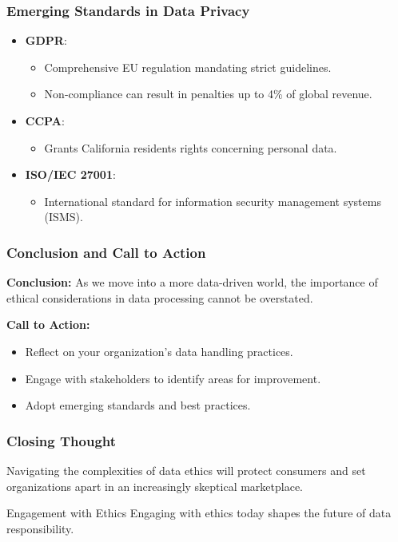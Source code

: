 \documentclass{beamer}
\begin{document}
\begin{frame}[fragile]
    \frametitle{Emerging Standards in Data Privacy}
    \begin{itemize}
        \item \textbf{GDPR}: 
            \begin{itemize}
                \item Comprehensive EU regulation mandating strict guidelines.
                \item Non-compliance can result in penalties up to 4\% of global revenue.
            \end{itemize}
        \item \textbf{CCPA}: 
            \begin{itemize}
                \item Grants California residents rights concerning personal data.
            \end{itemize}
        \item \textbf{ISO/IEC 27001}: 
            \begin{itemize}
                \item International standard for information security management systems (ISMS).
            \end{itemize}
    \end{itemize}
\end{frame}

\begin{frame}[fragile]
    \frametitle{Conclusion and Call to Action}
    \textbf{Conclusion:}
    As we move into a more data-driven world, the importance of ethical considerations in data processing cannot be overstated.
    
    \textbf{Call to Action:}
    \begin{itemize}
        \item Reflect on your organization’s data handling practices.
        \item Engage with stakeholders to identify areas for improvement.
        \item Adopt emerging standards and best practices.
    \end{itemize}
\end{frame}

\begin{frame}[fragile]
    \frametitle{Closing Thought}
    Navigating the complexities of data ethics will protect consumers and set organizations apart in an increasingly skeptical marketplace.
    \begin{block}{Engagement with Ethics}
        Engaging with ethics today shapes the future of data responsibility.
    \end{block}
\end{frame}
\end{document}
